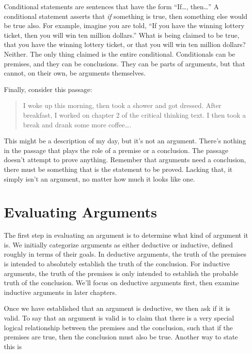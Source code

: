 Conditional statements are sentences that have the form \enquote{If\ldots, then\ldots} A conditional statement asserts that \emph{if} something is true, then something else would be true also. For example, imagine you are told, \enquote{If you have the winning lottery ticket, then you will win ten million dollars.} What is being claimed to be true, that you have the winning lottery ticket, or that you will win ten million dollars? Neither. The only thing claimed is the entire conditional. Conditionals can be premises, and they can be conclusions. They can be parts of arguments, but that cannot, on their own, be arguments themselves.

Finally, consider this passage:

\begin{quote}
I woke up this morning, then took a shower and got dressed. After breakfast, I worked on chapter 2 of the critical thinking text. I then took a break and drank some more coffee\ldots.
\end{quote}

This might be a description of my day, but it's not an argument. There's nothing in the passage that plays the role of a premise or a conclusion. The passage doesn't attempt to prove anything. Remember that arguments need a conclusion, there must be something that is the statement to be proved. Lacking that, it simply isn't an argument, no matter how much it looks like one.

\section{Evaluating Arguments}
\label{sec:evaluating-arguments}

The first step in evaluating an argument is to determine what kind of argument it is. We initially categorize arguments as either deductive or inductive, defined roughly in terms of their goals. In deductive arguments, the truth of the premises is intended to absolutely establish the truth of the conclusion. For inductive arguments, the truth of the premises is only intended to establish the probable truth of the conclusion. We'll focus on deductive arguments first, then examine inductive arguments in later chapters.

Once we have established that an argument is deductive, we then ask if it is valid. To say that an argument is valid is to claim that there is a very special logical relationship between the premises and the conclusion, such that if the premises are true, then the conclusion must also be true. Another way to state this is

